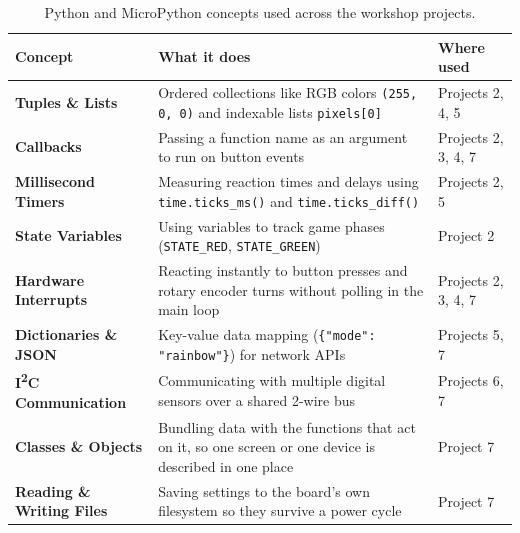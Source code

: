 \begin{table}[H]
\centering
\begin{tabular}{|l|>{\raggedright\arraybackslash}p{6.5cm}|l|}
    \hline
    \textbf{Concept} & \textbf{What it does} & \textbf{Where used} \\
    \hline
    \textbf{Tuples \& Lists} & Ordered collections like RGB colors \texttt{(255, 0, 0)} and indexable lists \texttt{pixels[0]} & Projects 2, 4, 5 \\
    \hline
    \textbf{Callbacks} & Passing a function name as an argument to run on button events & Projects 2, 3, 4, 7 \\
    \hline
    \textbf{Millisecond Timers} & Measuring reaction times and delays using \texttt{time.ticks\_ms()} and \texttt{time.ticks\_diff()} & Projects 2, 5 \\
    \hline
    \textbf{State Variables} & Using variables to track game phases (\texttt{STATE\_RED}, \texttt{STATE\_GREEN}) & Project 2 \\
    \hline
    \textbf{Hardware Interrupts} & Reacting instantly to button presses and rotary encoder turns without polling in the main loop & Projects 2, 3, 4, 7 \\
    \hline
    \textbf{Dictionaries \& JSON} & Key-value data mapping (\texttt{\{"mode": "rainbow"\}}) for network APIs & Projects 5, 7 \\
    \hline
    \textbf{I\textsuperscript{2}C Communication} & Communicating with multiple digital sensors over a shared 2-wire bus & Projects 6, 7 \\
    \hline
    \textbf{Classes \& Objects} & Bundling data with the functions that act on it, so one screen or one device is described in one place & Project 7 \\
    \hline
    \textbf{Reading \& Writing Files} & Saving settings to the board's own filesystem so they survive a power cycle & Project 7 \\
    \hline
\end{tabular}
\caption{Python and MicroPython concepts used across the workshop projects.}
\label{tab:python_concepts}
\end{table}
